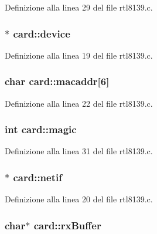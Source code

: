 Definizione alla linea 29 del file rtl8139.\+c.

\hypertarget{structcard_ac4d735012434df4c445edaffce28bd73}{
\subsubsection[{device}]{$\ast$ card\+::device}}\label{structcard_ac4d735012434df4c445edaffce28bd73}


Definizione alla linea 19 del file rtl8139.\+c.

\hypertarget{structcard_abe96f3126aa0a28b86a1748ad1f83f81}{
\subsubsection[{macaddr}]{\setlength{\rightskip}{0pt plus 5cm}char card\+::macaddr\mbox{[}6\mbox{]}}}\label{structcard_abe96f3126aa0a28b86a1748ad1f83f81}


Definizione alla linea 22 del file rtl8139.\+c.

\hypertarget{structcard_a63721f311b12c89790089bbcacc0060b}{
\subsubsection[{magic}]{\setlength{\rightskip}{0pt plus 5cm}int card\+::magic}}\label{structcard_a63721f311b12c89790089bbcacc0060b}


Definizione alla linea 31 del file rtl8139.\+c.

\hypertarget{structcard_ab3123a3dbb6dc38d86488ab37f7759ae}{
\subsubsection[{netif}]{$\ast$ card\+::netif}}\label{structcard_ab3123a3dbb6dc38d86488ab37f7759ae}


Definizione alla linea 20 del file rtl8139.\+c.

\hypertarget{structcard_a5cd3278f0e24fb6942e726b61bb032a6}{
\subsubsection[{rx\+Buffer}]{\setlength{\rightskip}{0pt plus 5cm}char$\ast$ card\+::rx\+Buffer}}\label{structcard_a5cd3278f0e24fb6942e726b61bb032a6}


